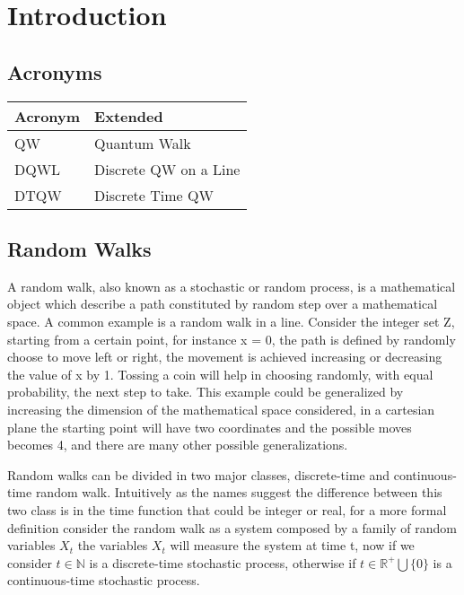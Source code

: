 \section{Introduction}

\subsection{Acronyms}

\begin{table}[h!]
\begin{tabular}{ll}
Acronym & Extended              \\
\hline
QW      & Quantum Walk          \\
DQWL    & Discrete QW on a Line \\
DTQW    & Discrete Time QW     
\end{tabular}
\end{table}

\subsection{Random Walks}

A random walk, also known as a stochastic or random process, is a mathematical object which describe a path constituted by random step over a mathematical space. A common 
example is a random walk in a line. Consider the integer set Z, starting from a certain point, for instance x = 0, the path is defined by randomly choose to move left or 
right, the movement is achieved increasing or decreasing the value of x by 1. Tossing a coin will help in choosing randomly, with equal probability, the next step to take. 
This example could be generalized by increasing the dimension of the mathematical space considered, in a cartesian plane the starting point will have two  
coordinates and the possible moves becomes 4, and there are many other possible generalizations.

Random walks can be divided in two major classes, discrete-time and continuous-time random walk. Intuitively as the names suggest the difference between this two class 
is in the time function that could be integer or real, for a more formal definition consider the random walk as a system composed by a family of random variables ${X_{t}}$
the variables $X_{t}$ will measure the system at time t, now if we consider $t\in \mathbb{N}$  is a discrete-time stochastic process, otherwise if 
$t \in \mathbb{R}^{+} \bigcup \{0\}$ is a continuous-time stochastic process. 

